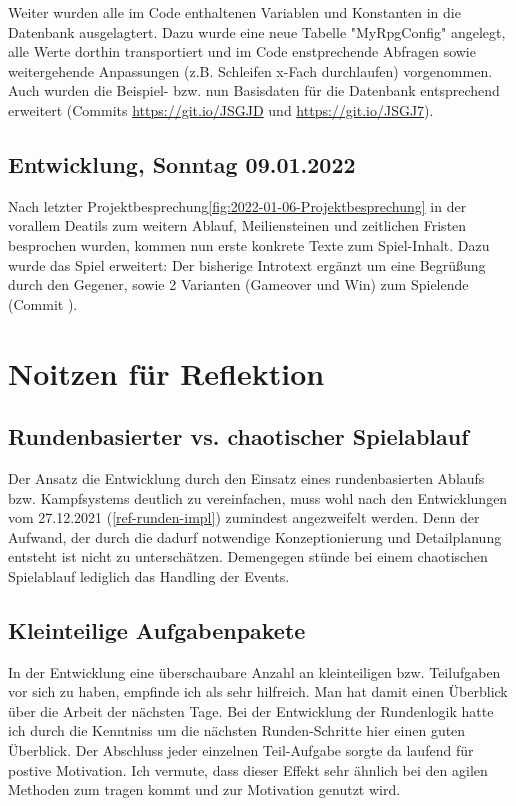 Weiter wurden alle im Code enthaltenen Variablen und Konstanten in die Datenbank ausgelagtert. Dazu wurde eine neue Tabelle "MyRpgConfig" angelegt, alle Werte dorthin transportiert und im Code enstprechende Abfragen sowie weitergehende Anpassungen (z.B. Schleifen x-Fach durchlaufen) vorgenommen. Auch wurden die Beispiel- bzw. nun Basisdaten für die Datenbank entsprechend erweitert (Commits \url{https://git.io/JSGJD} und \url{https://git.io/JSGJ7}).


\subsection{Entwicklung, Sonntag 09.01.2022}

Nach letzter Projektbesprechung\ref{fig:2022-01-06-Projektbesprechung} in der vorallem Deatils zum weitern Ablauf, Meiliensteinen und zeitlichen Fristen besprochen wurden, kommen nun erste konkrete Texte zum Spiel-Inhalt. Dazu wurde das Spiel erweitert: Der bisherige Introtext ergänzt um eine Begrüßung durch den Gegener, sowie 2 Varianten (Gameover und Win) zum Spielende (Commit \url{}).



\section{Noitzen für Reflektion}

\subsection{Rundenbasierter vs. chaotischer Spielablauf}

Der Ansatz die Entwicklung durch den Einsatz eines rundenbasierten Ablaufs bzw. Kampfsystems deutlich zu vereinfachen, muss wohl nach den Entwicklungen vom 27.12.2021 (\ref{ref-runden-impl}) zumindest angezweifelt werden. Denn der Aufwand, der durch die dadurf notwendige Konzeptionierung und Detailplanung entsteht ist nicht zu unterschätzen. Demengegen stünde bei einem chaotischen Spielablauf lediglich das Handling der Events. 

\subsection{Kleinteilige Aufgabenpakete} 

In der Entwicklung eine überschaubare Anzahl an kleinteiligen bzw. Teilufgaben vor sich zu haben, empfinde ich als sehr hilfreich. Man hat damit einen Überblick über die Arbeit der nächsten Tage. Bei der Entwicklung der Rundenlogik hatte ich durch die Kenntniss um die nächsten Runden-Schritte hier einen guten Überblick. Der Abschluss jeder einzelnen Teil-Aufgabe sorgte da laufend für postive Motivation. 
Ich vermute, dass dieser Effekt sehr ähnlich bei den agilen Methoden zum tragen kommt und zur Motivation genutzt wird. 


